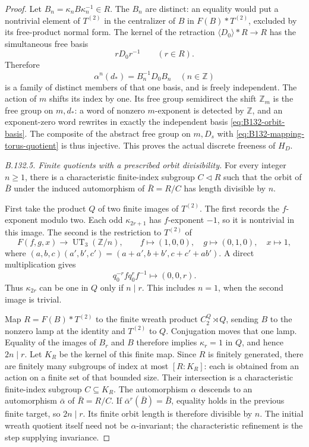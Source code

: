 \begin{proof}
Let \(B_n=\kappa_nB\kappa_n^{-1}\in R\).
The \(B_n\) are distinct: an equality would put a nontrivial
element of \(T^{(2)}\) in the centralizer of \(B\) in
\(F(B)*T^{(2)}\), excluded by its free-product normal form.
The kernel of the retraction
\(\langle D_0\rangle*R\to R\) has the simultaneous free basis
\[
 rD_0r^{-1}\qquad(r\in R).
\]
Therefore
\begin{equation}\label{eq:B132-orbit-basis}
 \alpha^n(d_*)=B_n^{-1}D_0B_n\quad(n\in\mathbb Z)
\end{equation}
is a family of distinct members of that one basis, and is freely
independent. The action of \(m\) shifts its index by one.
Its free group semidirect the shift \(\mathbb Z_m\) is the free
group on \(m,d_*\): a word of nonzero \(m\)-exponent is detected
by \(\mathbb Z\), and an exponent-zero word rewrites in exactly
the independent basis \eqref{eq:B132-orbit-basis}.
The composite of the abstract free group on \(m,D_s\) with
\eqref{eq:B132-mapping-torus-quotient} is thus injective. This
proves the actual discrete freeness of \(H_D\).

\emph{B.132.5. Finite quotients with a prescribed orbit divisibility.}
For every integer \(n\geq1\), there is a characteristic
finite-index subgroup \(C\triangleleft R\) such that the orbit
of \(\bar B\) under the induced automorphism of \(\bar R=R/C\)
has length divisible by \(n\).

First take the product \(Q\) of two finite images of \(T^{(2)}\).
The first records the \(f\)-exponent modulo two. Each odd
\(\kappa_{2r+1}\) has \(f\)-exponent \(-1\), so it is
nontrivial in this image. The second is the restriction to
\(T^{(2)}\) of
\[
 F(f,g,x)\longrightarrow\operatorname{UT}_3(\mathbb Z/n),\qquad
 f\longmapsto(1,0,0),\quad g\longmapsto(0,1,0),\quad x\longmapsto1,
\]
where
\((a,b,c)(a',b',c')=(a+a',b+b',c+c'+ab')\).
A direct multiplication gives
\[
 q_0^{-r}fq_0^rf^{-1}\longmapsto(0,0,r).
\]
Thus \(\kappa_{2r}\) can be one in \(Q\) only if \(n\mid r\).
This includes \(n=1\), when the second image is trivial.

Map \(R=F(B)*T^{(2)}\) to the finite wreath product
\(C_2^{Q}\rtimes Q\), sending \(B\) to the nonzero lamp at the
identity and \(T^{(2)}\) to \(Q\). Conjugation moves that one
lamp. Equality of the images of \(B_r\) and \(B\) therefore
implies \(\kappa_r=1\) in \(Q\), and hence \(2n\mid r\).
Let \(K_R\) be the kernel of this finite map. Since \(R\) is
finitely generated, there are finitely many subgroups of index at
most \([R:K_R]\): each is obtained from an action on a finite set
of that bounded size. Their intersection is a characteristic
finite-index subgroup \(C\subseteq K_R\).
The automorphism \(\alpha\) descends to an automorphism
\(\bar\alpha\) of \(\bar R=R/C\). If
\(\bar\alpha^r(\bar B)=\bar B\), equality holds in the previous
finite target, so \(2n\mid r\). Its finite orbit length is
therefore divisible by \(n\). The initial wreath quotient itself
need not be \(\alpha\)-invariant; the characteristic refinement
is the step supplying invariance.


\end{proof}
